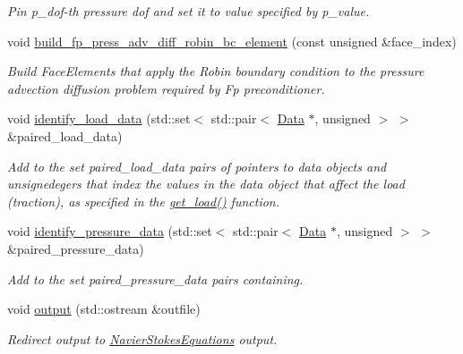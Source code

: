 \begin{DoxyCompactItemize}
\begin{DoxyCompactList}\small\item\em Pin p\+\_\+dof-\/th pressure dof and set it to value specified by p\+\_\+value. \end{DoxyCompactList}\item 
void \hyperlink{classoomph_1_1TCrouzeixRaviartElement_ad99c365335e965607273f133d8739ae2}{build\+\_\+fp\+\_\+press\+\_\+adv\+\_\+diff\+\_\+robin\+\_\+bc\+\_\+element} (const unsigned \&face\+\_\+index)
\begin{DoxyCompactList}\small\item\em Build Face\+Elements that apply the Robin boundary condition to the pressure advection diffusion problem required by Fp preconditioner. \end{DoxyCompactList}\item 
void \hyperlink{classoomph_1_1TCrouzeixRaviartElement_a009e154cb1934dce92933a36280333a6}{identify\+\_\+load\+\_\+data} (std\+::set$<$ std\+::pair$<$ \hyperlink{classoomph_1_1Data}{Data} $\ast$, unsigned $>$ $>$ \&paired\+\_\+load\+\_\+data)
\begin{DoxyCompactList}\small\item\em Add to the set paired\+\_\+load\+\_\+data pairs of pointers to data objects and unsignedegers that index the values in the data object that affect the load (traction), as specified in the \hyperlink{classoomph_1_1NavierStokesEquations_af2e10e52fc3a54b580e330fd763aa9f5}{get\+\_\+load()} function. \end{DoxyCompactList}\item 
void \hyperlink{classoomph_1_1TCrouzeixRaviartElement_aa79bbce43b6f27acb68f87a5c4a57b9b}{identify\+\_\+pressure\+\_\+data} (std\+::set$<$ std\+::pair$<$ \hyperlink{classoomph_1_1Data}{Data} $\ast$, unsigned $>$ $>$ \&paired\+\_\+pressure\+\_\+data)
\begin{DoxyCompactList}\small\item\em Add to the set {\ttfamily paired\+\_\+pressure\+\_\+data} pairs containing. \end{DoxyCompactList}\item 
void \hyperlink{classoomph_1_1TCrouzeixRaviartElement_a9d8ebc6516e9c98a4fefdea2a821356d}{output} (std\+::ostream \&outfile)
\begin{DoxyCompactList}\small\item\em Redirect output to \hyperlink{classoomph_1_1NavierStokesEquations}{Navier\+Stokes\+Equations} output. \end{DoxyCompactList}\item 

\end{DoxyCompactItemize}
